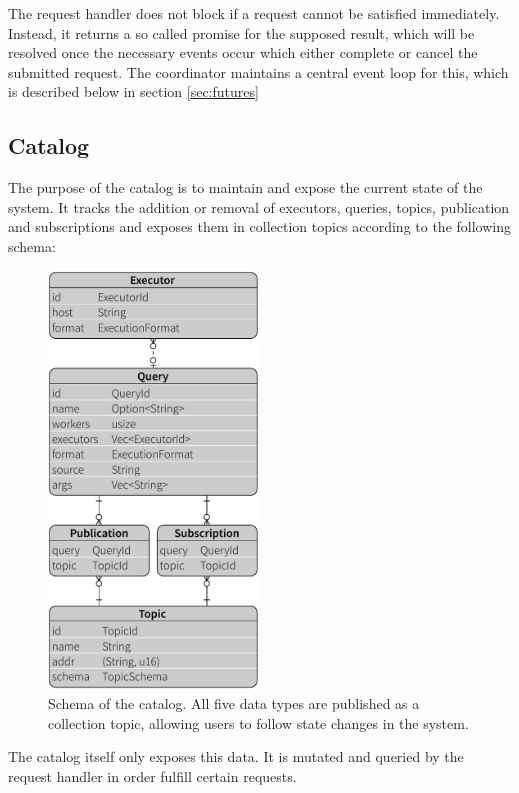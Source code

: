 The request handler does not block if a request cannot be satisfied
immediately. Instead, it returns a so called promise for the supposed result,
which will be resolved once the necessary events occur which either complete or cancel the
submitted request. The coordinator maintains a central event loop for this, which
is described below in section \ref{sec:futures}

\subsection{Catalog}

The purpose of the catalog is to maintain and expose the current state of the
system. It tracks the addition or removal of executors, queries, topics,
publication and subscriptions and exposes them in collection topics according
to the following schema:

\begin{figure}[htb]
  \centering
    \includegraphics[width=0.5\textwidth]{figures/model}
  \caption[Schema of the catalog.]{Schema of the catalog. All five data types
  are published as a collection topic, allowing users to follow state changes
  in the system.}
  \label{fig:model}
\end{figure}

The catalog itself only exposes this data. It is mutated and queried by the
request handler in order fulfill certain requests.

